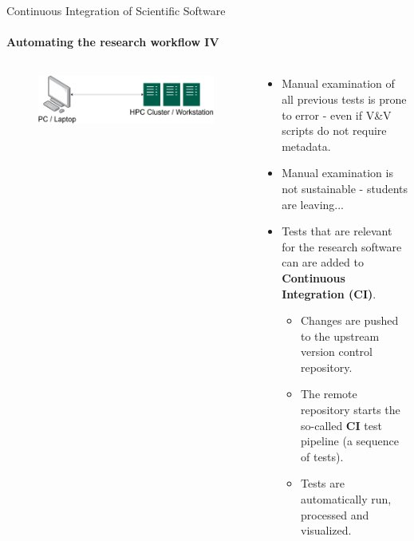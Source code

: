 \begin{frame}{Continuous Integration of Scientific Software}
    \framesubtitle{Automating the research workflow IV} 
    \vfill

        \begin{columns}
            \begin{column}[c]{0.5\textwidth}
                \begin{figure}
                    \centering
                    \includegraphics[width=\columnwidth]{figures/workflow-overview.png}
                \end{figure}
            \end{column}
            \begin{column}[c]{0.5\textwidth}
                \begin{itemize}
                    \item Manual examination of all previous tests is prone to error - even if V\&V scripts do not require metadata. 
                    \item Manual examination is not sustainable - students are leaving...
                    \item Tests that are relevant for the research software can are added to \textbf{Continuous Integration (CI)}.  
                    \begin{itemize}
                        \item Changes are pushed to the upstream version control repository.  
                        \item The remote repository starts the so-called \textbf{CI} test pipeline (a sequence of tests). 
                        \item Tests are automatically run, processed and visualized. 
                    \end{itemize}
                \end{itemize}
            \end{column}
        \end{columns}
\end{frame}

